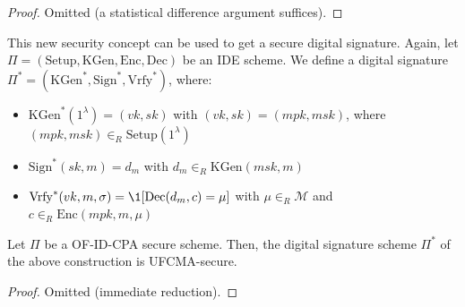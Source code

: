 \documentclass[a4paper, 12pt]{report}
\begin{document}
    \begin{proof}
        Omitted (a statistical difference argument suffices).
    \end{proof}

    This new security concept can be used to get a secure digital signature. Again, let $\Pi = (\mathrm{Setup}, \mathrm{KGen}, \mathrm{Enc}, \mathrm{Dec})$ be an IDE scheme. We define a digital signature $\Pi^* = (\mathrm{KGen}^*, \mathrm{Sign}^*, \mathrm{Vrfy}^*)$, where:
    \begin{itemize}
        \item $\mathrm{KGen}^*(1^\lambda) = (vk, sk)$ with $(vk,sk) = (mpk, msk)$, where $(mpk, msk) \in_R \mathrm{Setup}(1^{\lambda})$
        \item $\mathrm{Sign}^*(sk, m) = d_m$ with $d_m \in_R \mathrm{KGen}(msk, m)$
        \item $\mathrm{Vrfy}^*(vk, m, \sigma) = \1[\mathrm{Dec}(d_{m}, c) = \mu]$ with $\mu \in_R \mathcal{M}$ and $c \in_R \mathrm{Enc}(mpk, m, \mu)$
    \end{itemize}

    \begin{framedthm}{}
        Let $\Pi$ be a OF-ID-CPA secure scheme. Then, the digital signature scheme $\Pi^*$ of the above construction is UFCMA-secure.
    \end{framedthm}

    \begin{proof}
        Omitted (immediate reduction).
    \end{proof}
\end{document}
